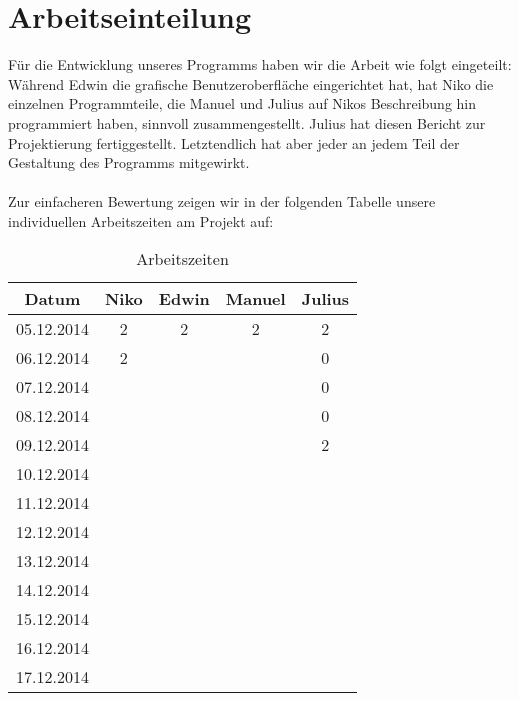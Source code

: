 \documentclass[a4paper, 11pt, titlepage]{article}
\begin{document}
\section{Arbeitseinteilung}

Für die Entwicklung unseres Programms haben wir die Arbeit wie folgt eingeteilt: Während Edwin die grafische Benutzeroberfläche eingerichtet hat, hat Niko die einzelnen Programmteile, die Manuel und Julius auf Nikos Beschreibung hin programmiert haben, sinnvoll zusammengestellt. Julius hat diesen Bericht zur Projektierung fertiggestellt. Letztendlich hat aber jeder an jedem Teil der Gestaltung des Programms mitgewirkt.\\\\
Zur einfacheren Bewertung zeigen wir in der folgenden Tabelle unsere individuellen Arbeitszeiten am Projekt auf:
\begin{table}[htbp]
\centering
\begin{tabular}{|c||c|c|c|c|}
\hline
Datum & Niko & Edwin & Manuel & Julius \\
\hline
\hline
05.12.2014 & 2 & 2 & 2 & 2 \\
\hline
06.12.2014 & 2 &  &  & 0 \\
\hline
07.12.2014 &  &  &  & 0 \\
\hline
08.12.2014 &  &  &  & 0 \\
\hline
09.12.2014 &  &  &  & 2 \\
\hline
10.12.2014 &  &  &  & \\
\hline
11.12.2014 &  &  &  & \\
\hline
12.12.2014 &  &  &  & \\
\hline
13.12.2014 &  &  &  & \\
\hline
14.12.2014 &  &  &  & \\
\hline
15.12.2014 &  &  &  & \\
\hline
16.12.2014 &  &  &  & \\
\hline
17.12.2014 &  &  &  & \\
\hline
\end{tabular}
\caption{Arbeitszeiten}
\end{table}
\end{document}
